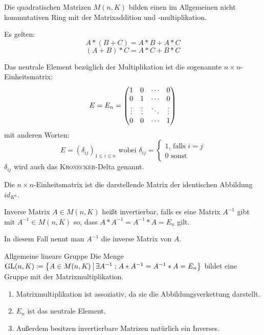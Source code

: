 Die quadratischen Matrizen $M(n,K)$ bilden einen im Allgemeinen nicht kommutativen Ring mit der Matrixaddition und -multiplikation.

Es gelten:
\begin{equation*}
	A*(B+C)=A*B+A*C
\end{equation*}
\begin{equation*}
	(A+B)*C=A*C+B*C
\end{equation*}

Das neutrale Element bezüglich der Multiplikation ist die sogenannte $n\times n$-Einheitsmatrix:
\begin{equation*}
	E=E_n=\matrix{
		1 & 0 & \cdots & 0\\
		0 & 1 & \cdots & 0\\
		\vdots & \vdots & \ddots & \vdots\\
		0 & 0 & \cdots & 1
		}
\end{equation*}
mit anderen Worten:
\begin{equation*}
	E=(\delta_{ij})_{1\leq i \leq n} \text{ wobei }
	\delta_{ij}=
	\begin{cases}
		1\text{, falls $i=j$} \\
		0\text{ sonst}
	\end{cases}
\end{equation*}
$\delta_{ij}$ wird auch das \textsc{Kronecker}-Delta genannt.

Die $n\times n$-Einheitsmatrix ist die darstellende Matrix der identischen Abbildung $id_{K^n}$.

\begin{definition}{Inverse Matrix}
	$A\in M(n,K)$ heißt invertierbar, falls es eine Matrix $A^{-1}$ gibt mit $A^{-1}\in M(n,K)$ so, dass $A*A^{-1}=A^{-1}*A=E_n$ gilt.

	In diesem Fall nennt man $A^{-1}$ die inverse Matrix von $A$.
\end{definition}

\begin{satz}{Allgemeine lineare Gruppe}
	Die Menge $\mathrm{GL}(n,K)\coloneqq \left\{ A\in M(n,K) \,\middle|\, \exists A^{-1} : A*A^{-1} = A^{-1}*A = E_n \right\}$ bildet eine Gruppe mit der Matrixmultiplikation.
\end{satz}

\beweis
\begin{enumerate}
	\item Matrixmultiplikation ist assoziativ, da sie die Abbildungsverkettung darstellt.
	\item $E_n$ ist das neutrale Element.
	\item Außerdem besitzen invertierbare Matrizen natürlich ein Inverses.
\end{enumerate}

